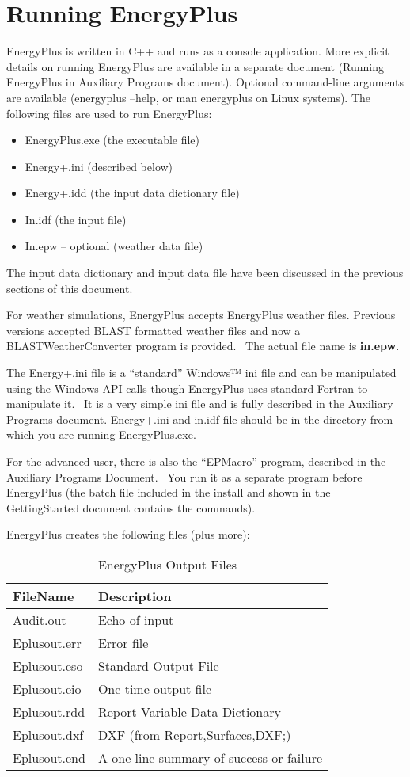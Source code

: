 \chapter{Running EnergyPlus}\label{running-energyplus}

EnergyPlus is written in C++ and runs as a console application. More explicit details on running EnergyPlus are available in a separate document (Running EnergyPlus in Auxiliary Programs document). Optional command-line arguments are available (energyplus --help, or man energyplus on Linux systems). The following files are used to run EnergyPlus:

\begin{itemize}
\item
  EnergyPlus.exe (the executable file)
\item
  Energy+.ini (described below)
\item
  Energy+.idd (the input data dictionary file)
\item
  In.idf (the input file)
\item
  In.epw -- optional (weather data file)
\end{itemize}

The input data dictionary and input data file have been discussed in the previous sections of this document.

For weather simulations, EnergyPlus accepts EnergyPlus weather files. Previous versions accepted BLAST formatted weather files and now a BLASTWeatherConverter program is provided.~ The actual file name is \textbf{in.epw}.

The Energy+.ini file is a ``standard'' Windows™ ini file and can be manipulated using the Windows API calls though EnergyPlus uses standard Fortran to manipulate it.~ It is a very simple ini file and is fully described in the \href{file:///E:/Docs4PDFs/AuxiliaryPrograms.pdf}{Auxiliary Programs} document. Energy+.ini and in.idf file should be in the directory from which you are running EnergyPlus.exe.

For the advanced user, there is also the ``EPMacro'' program, described in the Auxiliary Programs Document.~ You run it as a separate program before EnergyPlus (the batch file included in the install and shown in the GettingStarted document contains the commands).

EnergyPlus creates the following files (plus more):

\begin{longtable}[c]{@{}ll@{}}
\caption{  EnergyPlus Output Files \protect \label{table:energyplus-output-files}}\\
\toprule 
FileName & Description \tabularnewline \midrule
\endhead
Audit.out & Echo of input \tabularnewline
Eplusout.err & Error file \tabularnewline
Eplusout.eso & Standard Output File \tabularnewline
Eplusout.eio & One time output file \tabularnewline
Eplusout.rdd & Report Variable Data Dictionary \tabularnewline
Eplusout.dxf & DXF (from Report,Surfaces,DXF;) \tabularnewline
Eplusout.end & A one line summary of success or failure \tabularnewline
\bottomrule
\end{longtable}

